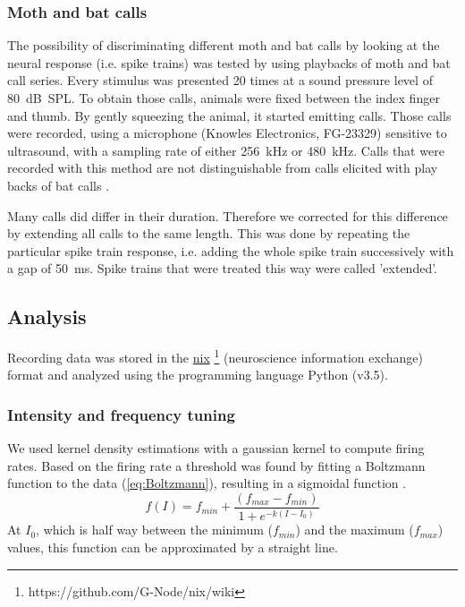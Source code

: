\documentclass[12pt,a4paper]{article}
\begin{document}
\subsubsection{Moth and bat calls}
The possibility of discriminating different moth and bat calls by looking at the neural response (i.e. spike trains) was tested by using playbacks of moth and bat call series. Every stimulus was presented 20 times at a sound pressure level of 80~dB~SPL. To obtain those calls, animals were fixed between the index finger and thumb. By gently squeezing the animal, it started emitting calls. Those calls were recorded, using a microphone (Knowles Electronics, FG-23329) sensitive to ultrasound, with a sampling rate of either 256~kHz or 480~kHz. Calls that were recorded with this method are not distinguishable from calls elicited with play backs of bat calls \parencite{barber_tiger_2006, corcoran_antibat_2010}.

Many calls did differ in their duration. Therefore we corrected for this difference by extending all calls to the same length. This was done by repeating the particular spike train response, i.e. adding the whole spike train successively with a gap of 50~ms. Spike trains that were treated this way were called 'extended'.

\subsection{Analysis}
Recording data was stored in the \href{https://github.com/G-Node/nix/wiki}{nix} \footnote{https://github.com/G-Node/nix/wiki} (neuroscience information exchange) format and analyzed using the programming language Python (v3.5).
 
\subsubsection{Intensity and frequency tuning}
We used kernel density estimations with a gaussian kernel to compute firing rates. Based on the firing rate a threshold was found by fitting a Boltzmann function to the data (\ref{eq:Boltzmann}), resulting in a sigmoidal function \parencite{benda_spikefrequency_2008}.
\begin{equation}
\label{eq:Boltzmann}
f(I) = f_{min} + \frac{(f_{max}-f_{min})}{1+e^{-k(I-I_0)}}
\end{equation}
At $I_{0}$, which is half way between the minimum ($f_{min}$) and the maximum ($f_{max}$) values, this function can be approximated by a straight line.
\end{document}

